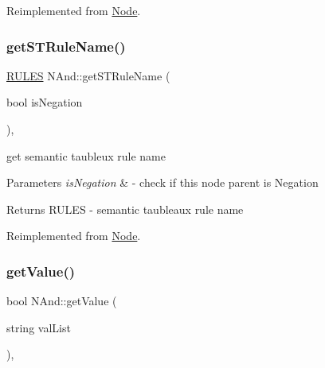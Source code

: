 Reimplemented from \hyperlink{class_node_a1009cb6d84206c2b5eaa86580da59a7c}{Node}.

\mbox{\label{class_n_and_a8570a747f7f4aec32bb962227749566f}} 
\subsubsection{\texorpdfstring{get\+S\+T\+Rule\+Name()}{getSTRuleName()}}
{\footnotesize\ttfamily \hyperlink{proposition_2tableaux_2enum_8h_a70c93904c6a27d228050f922eb4fc3b8}{R\+U\+L\+ES} N\+And\+::get\+S\+T\+Rule\+Name (\begin{DoxyParamCaption}\item[{bool}]{is\+Negation }\end{DoxyParamCaption})\hspace{0.3cm}{\ttfamily [override]}, {\ttfamily [virtual]}}



get semantic taubleux rule name 


\begin{DoxyParams}{Parameters}
{\em is\+Negation} & -\/ check if this node parent is Negation \\
\hline
\end{DoxyParams}
\begin{DoxyReturn}{Returns}
R\+U\+L\+ES -\/ semantic taubleaux rule name 
\end{DoxyReturn}


Reimplemented from \hyperlink{class_node_a25b6581950988c2536a392a6874c8072}{Node}.

\mbox{\label{class_n_and_a9eb3a117e8d30f11ebe25e932d387265}} 
\subsubsection{\texorpdfstring{get\+Value()}{getValue()}}
{\footnotesize\ttfamily bool N\+And\+::get\+Value (\begin{DoxyParamCaption}\item[{string}]{val\+List }\end{DoxyParamCaption})\hspace{0.3cm}{\ttfamily [override]}, {\ttfamily [virtual]}}



